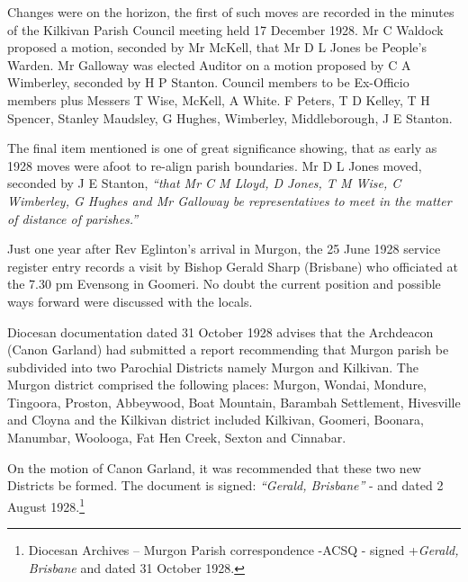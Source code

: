 Changes were on the horizon, the first of such moves are recorded in the minutes of the Kilkivan Parish Council meeting held 17 December 1928. Mr C Waldock proposed a motion, seconded by Mr McKell, that Mr D L Jones be People's Warden. Mr Galloway was elected Auditor on a motion proposed by C A Wimberley, seconded by H P Stanton. Council members to be Ex-Officio members plus Messers T Wise, McKell, A White. F Peters, T D Kelley, T H Spencer, Stanley Maudsley, G Hughes, Wimberley, Middleborough, J E Stanton.



The final item mentioned is one of great significance showing, that as early as 1928 moves were afoot to re-align parish boundaries. Mr D L Jones moved, seconded by J E Stanton, \emph{``that Mr C M Lloyd, D Jones, T M Wise, C Wimberley, G Hughes and Mr Galloway be representatives to meet in the matter of distance of parishes.''}



Just one year after Rev Eglinton's arrival in Murgon, the 25 June 1928 service register entry records a visit by Bishop Gerald Sharp (Brisbane) who officiated at the 7.30 pm Evensong in Goomeri. No doubt the current position and possible ways forward were discussed with the locals.



Diocesan documentation dated 31 October 1928 advises that the Archdeacon (Canon Garland) had submitted a report recommending that Murgon parish be subdivided into two Parochial Districts namely Murgon and Kilkivan. The Murgon district comprised the following places: Murgon, Wondai, Mondure, Tingoora, Proston, Abbeywood, Boat Mountain, Barambah Settlement, Hivesville and Cloyna and the Kilkivan district included Kilkivan, Goomeri, Boonara, Manumbar, Woolooga, Fat Hen Creek, Sexton and Cinnabar.



On the motion of Canon Garland, it was recommended that these two new Districts be formed. The document is signed: \emph{``Gerald, Brisbane''} - and dated 2 August 1928.\footnote{Diocesan Archives -- Murgon Parish correspondence -ACSQ - signed +\emph{Gerald, Brisbane} and dated 31 October 1928.}


